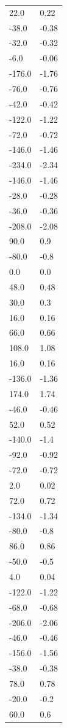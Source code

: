 \begin{longtable}{ll}
22.0 & 0.22 \\
-38.0 & -0.38 \\
-32.0 & -0.32 \\
-6.0 & -0.06 \\
-176.0 & -1.76 \\
-76.0 & -0.76 \\
-42.0 & -0.42 \\
-122.0 & -1.22 \\
-72.0 & -0.72 \\
-146.0 & -1.46 \\
-234.0 & -2.34 \\
-146.0 & -1.46 \\
-28.0 & -0.28 \\
-36.0 & -0.36 \\
-208.0 & -2.08 \\
90.0 & 0.9 \\
-80.0 & -0.8 \\
0.0 & 0.0 \\
48.0 & 0.48 \\
30.0 & 0.3 \\
16.0 & 0.16 \\
66.0 & 0.66 \\
108.0 & 1.08 \\
16.0 & 0.16 \\
-136.0 & -1.36 \\
174.0 & 1.74 \\
-46.0 & -0.46 \\
52.0 & 0.52 \\
-140.0 & -1.4 \\
-92.0 & -0.92 \\
-72.0 & -0.72 \\
2.0 & 0.02 \\
72.0 & 0.72 \\
-134.0 & -1.34 \\
-80.0 & -0.8 \\
86.0 & 0.86 \\
-50.0 & -0.5 \\
4.0 & 0.04 \\
-122.0 & -1.22 \\
-68.0 & -0.68 \\
-206.0 & -2.06 \\
-46.0 & -0.46 \\
-156.0 & -1.56 \\
-38.0 & -0.38 \\
78.0 & 0.78 \\
-20.0 & -0.2 \\
60.0 & 0.6 \\

\end{longtable}
